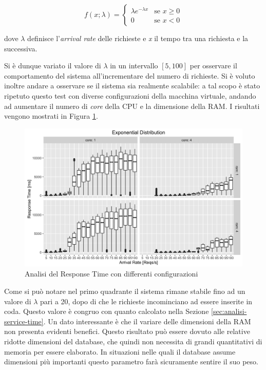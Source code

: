 \begin{equation}
	f(x;\lambda) = 
	\begin{cases}
		\lambda e^{-\lambda x} & \text{se } x \ge 0 \\
		0 & \text{se } x < 0
	\end{cases}
\end{equation}

dove $ \lambda $ definisce l'\emph{arrival rate} delle richieste e \emph{x} il tempo tra una richiesta e la successiva.

Si è dunque variato il valore di $ \lambda $ in un intervallo $ [5, 100] $ per osservare il comportamento del sistema all'incrementare del numero di richieste. Si è voluto inoltre andare a osservare se il sistema sia realmente scalabile: a tal scopo è stato ripetuto questo test con diverse configurazioni della macchina virtuale, andando ad aumentare il numero di \emph{core} della CPU e la dimensione della RAM. I risultati vengono mostrati in Figura \ref{fig:exponential-analysis}.

\begin{figure}[ht]
	\centering
	\includegraphics[width=\textwidth]{7-performance/Immagini/exponential_analysis.png}
	\caption{Analisi del Response Time con differenti configurazioni}\label{fig:exponential-analysis}
\end{figure}

Come si può notare nel primo quadrante il sistema rimane stabile fino ad un valore di $ \lambda $ pari a 20, dopo di che le richieste incominciano ad essere inserite in coda. Questo valore è congruo con quanto calcolato nella Sezione \ref{sec:analisi-service-time}. Un dato interessante è che il variare delle dimensioni della RAM non presenta evidenti benefici. Questo risultato può essere dovuto alle relative ridotte dimensioni del database, che quindi non necessita di grandi quantitativi di memoria per essere elaborato. In situazioni nelle quali il database assume dimensioni più importanti questo parametro farà sicuramente sentire il suo peso.

